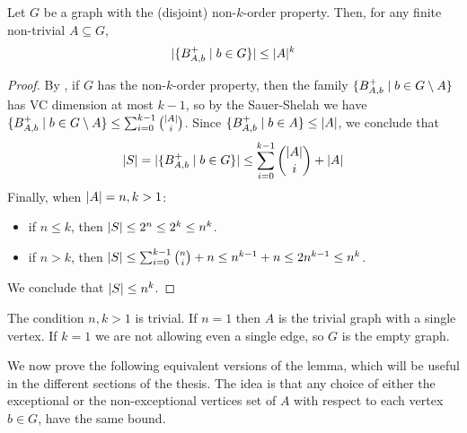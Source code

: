     \begin{lemma} \label{lem:k_order_property_bounds_BAbs}
        Let $G$ be a graph with the (disjoint) non-$k$-order property.
        Then, for any finite non-trivial $A \subseteq G$,
        \[
            | \{ B^+_{A,b} \mid b \in G \} | \leq |A|^k
        \]
        \begin{proof}
            By , if $G$ has the non-$k$-order property,
            then the family $\{ B^+_{A,b} \mid b \in G \setminus A \}$ has VC dimension at most $k-1$,
            so by the Sauer-Shelah  we have
            $\{ B^+_{A,b} \mid b \in G \setminus A \} \leq \sum_{i=0}^{k-1} \binom{|A|}{i}$.
            Since $\{ B^+_{A,b} \mid b \in A \} \leq | A |$, we conclude that
            \[
                | S | = | \{ B^+_{A,b} \mid b \in G \} | \leq \sum_{i=0}^{k-1} \binom{|A|}{i} + |A|
            \]
            Finally, when $| A | = n,k > 1$: 
            \begin{itemize}
                \item if $n \leq k$, then $| S | \leq 2^n \leq 2^k \leq n^k$.
                \item if $n > k$, then $| S | \leq \sum_{i=0}^{k-1} {n \choose i} + n \leq n^{k-1} + n \leq 2n^{k-1} \leq n^k$.
            \end{itemize}
            We conclude that $| S | \leq n^k$.
        \end{proof}
    \end{lemma}

    \begin{remark}
        The condition $n,k > 1$ is trivial.
        If $n=1$ then $A$ is the trivial graph with a single vertex.
        If $k=1$ we are not allowing even a single edge, so $G$ is the empty graph.
    \end{remark}

    We now prove the following equivalent versions of the lemma, which will be useful in the different sections of the
    thesis.
    The idea is that any choice of either the exceptional or the non-exceptional vertices set of $A$ with respect to
    each vertex $b \in G$, have the same bound.

